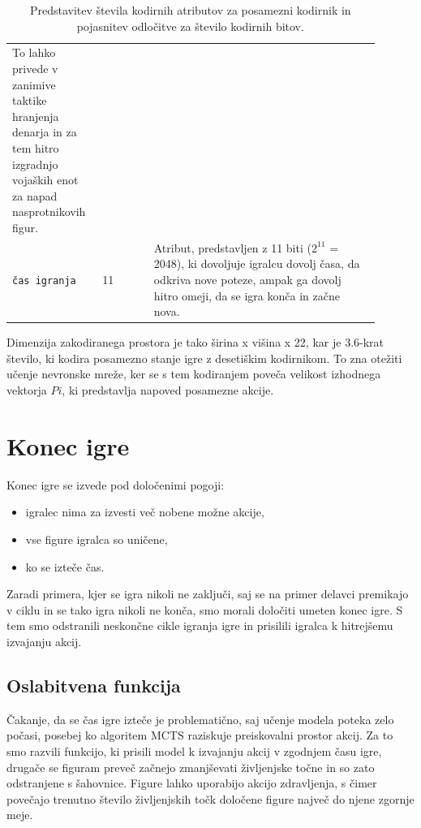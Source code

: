 \documentclass[a4paper, 12pt]{book}
\begin{document}
{\begin{table}
\begin{center}
\begin{tabular}{p{0.19\linewidth}|p{0.13\linewidth}|p{0.58\linewidth}}
																                   To lahko privede v zanimive taktike hranjenja denarja in za tem hitro izgradnjo vojaških enot za napad nasprotnikovih figur.\\
			{\tt čas igranja}                          & 11                      & Atribut, predstavljen z 11 biti ($2^{11}$ = 2048), ki dovoljuje igralcu dovolj časa, da odkriva nove poteze, ampak ga dovolj hitro omeji, da se igra konča in začne nova.\\
		\end{tabular}
	\end{center}
	\caption{Predstavitev števila kodirnih atributov za posamezni kodirnik in pojasnitev odločitve za število kodirnih bitov. }
	\label{tableEncodersOneHot}
\end{table}

Dimenzija zakodiranega prostora je tako širina x višina x 22, kar je 3.6-krat število, ki kodira posamezno stanje igre z desetiškim kodirnikom.
To zna otežiti učenje nevronske mreže, ker se s tem kodiranjem poveča velikost izhodnega vektorja $Pi$, ki predstavlja napoved posamezne akcije.

\section{Konec igre}
\label{sKonecIgre}
Konec igre se izvede pod določenimi pogoji:
\begin{itemize}
	\item igralec nima za izvesti več nobene možne akcije,
	\item vse figure igralca so uničene,
	\item ko se izteče čas.
\end{itemize}
\noindent
Zaradi primera, kjer se igra nikoli ne zaključi, saj se na primer delavci premikajo v ciklu in se tako igra nikoli ne konča, smo morali določiti umeten konec igre.
S tem smo odstranili neskončne cikle igranja igre in prisilili igralca k hitrejšemu izvajanju akcij.

\subsection{Oslabitvena funkcija}
\label{sKillFunction}
Čakanje, da se čas igre izteče je problematično, saj učenje modela poteka zelo počasi, posebej ko algoritem MCTS raziskuje preiskovalni prostor akcij.
Za to smo razvili funkcijo, ki prisili model k izvajanju akcij v zgodnjem času igre, drugače se figuram preveč začnejo zmanjševati življenjske točne in so zato odstranjene s šahovnice.
Figure lahko uporabijo akcijo zdravljenja, s čimer povečajo trenutno število življenjskih točk določene figure največ do njene zgornje meje.

}
\end{document}
